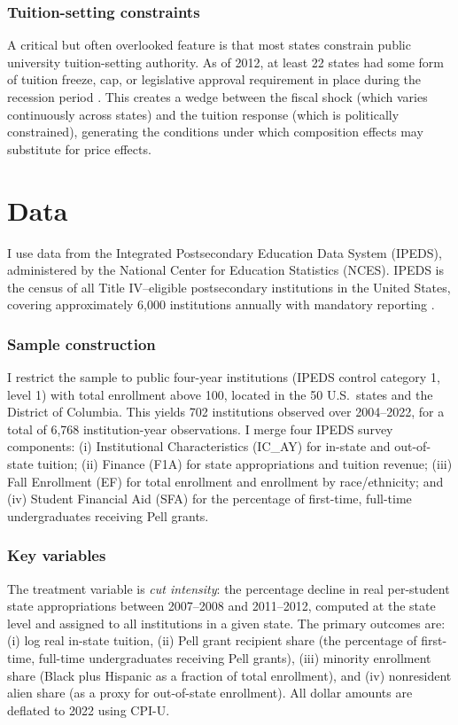 \documentclass[12pt]{article}
\begin{document}
\subsubsection*{Tuition-setting constraints} A critical but often overlooked feature is that most states constrain public university tuition-setting authority. As of 2012, at least 22 states had some form of tuition freeze, cap, or legislative approval requirement in place during the recession period \citep{rizzo2006state, tandberg2014state}. This creates a wedge between the fiscal shock (which varies continuously across states) and the tuition response (which is politically constrained), generating the conditions under which composition effects may substitute for price effects.

\section{Data}

I use data from the Integrated Postsecondary Education Data System (IPEDS), administered by the National Center for Education Statistics (NCES). IPEDS is the census of all Title IV--eligible postsecondary institutions in the United States, covering approximately 6,000 institutions annually with mandatory reporting \citep{ncesipeds2023}.

\subsubsection*{Sample construction} I restrict the sample to public four-year institutions (IPEDS control category 1, level 1) with total enrollment above 100, located in the 50 U.S.\ states and the District of Columbia. This yields 702 institutions observed over 2004--2022, for a total of 6,768 institution-year observations. I merge four IPEDS survey components: (i) Institutional Characteristics (IC\_AY) for in-state and out-of-state tuition; (ii) Finance (F1A) for state appropriations and tuition revenue; (iii) Fall Enrollment (EF) for total enrollment and enrollment by race/ethnicity; and (iv) Student Financial Aid (SFA) for the percentage of first-time, full-time undergraduates receiving Pell grants.

\subsubsection*{Key variables} The treatment variable is \textit{cut intensity}: the percentage decline in real per-student state appropriations between 2007--2008 and 2011--2012, computed at the state level and assigned to all institutions in a given state. The primary outcomes are: (i) log real in-state tuition, (ii) Pell grant recipient share (the percentage of first-time, full-time undergraduates receiving Pell grants), (iii) minority enrollment share (Black plus Hispanic as a fraction of total enrollment), and (iv) nonresident alien share (as a proxy for out-of-state enrollment). All dollar amounts are deflated to 2022 using CPI-U.
\end{document}

